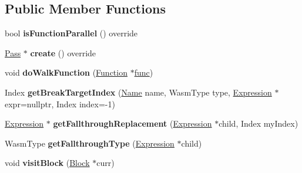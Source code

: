 \subsection*{Public Member Functions}
\begin{DoxyCompactItemize}
\item 
\mbox{\label{structwasm_1_1_flatten_control_flow_a8967f0c2edd3d7ae8d31304e298eec39}} 
bool {\bfseries is\+Function\+Parallel} () override
\item 
\mbox{\label{structwasm_1_1_flatten_control_flow_a6c8563946eaf7e75e07b32fdb856b231}} 
\mbox{\hyperlink{classwasm_1_1_pass}{Pass}} $\ast$ {\bfseries create} () override
\item 
\mbox{\label{structwasm_1_1_flatten_control_flow_aec7783f891436d4f1c75745807b3f223}} 
void {\bfseries do\+Walk\+Function} (\mbox{\hyperlink{classwasm_1_1_function}{Function}} $\ast$\mbox{\hyperlink{structfunc}{func}})
\item 
\mbox{\label{structwasm_1_1_flatten_control_flow_afe4371b075fa6ef02f44aaa4f90c1425}} 
Index {\bfseries get\+Break\+Target\+Index} (\mbox{\hyperlink{structwasm_1_1_name}{Name}} name, Wasm\+Type type, \mbox{\hyperlink{classwasm_1_1_expression}{Expression}} $\ast$expr=nullptr, Index index=-\/1)
\item 
\mbox{\label{structwasm_1_1_flatten_control_flow_aa48ea1d55a71b59c0bf7663c188602c8}} 
\mbox{\hyperlink{classwasm_1_1_expression}{Expression}} $\ast$ {\bfseries get\+Fallthrough\+Replacement} (\mbox{\hyperlink{classwasm_1_1_expression}{Expression}} $\ast$child, Index my\+Index)
\item 
\mbox{\label{structwasm_1_1_flatten_control_flow_afeb3ae9a1f3fff046caa872a9b068340}} 
Wasm\+Type {\bfseries get\+Fallthrough\+Type} (\mbox{\hyperlink{classwasm_1_1_expression}{Expression}} $\ast$child)
\item 
\mbox{\label{structwasm_1_1_flatten_control_flow_a63cff82e8b3507dcf323750f1781b5d8}} 
void {\bfseries visit\+Block} (\mbox{\hyperlink{classwasm_1_1_block}{Block}} $\ast$curr)

\end{DoxyCompactItemize}
